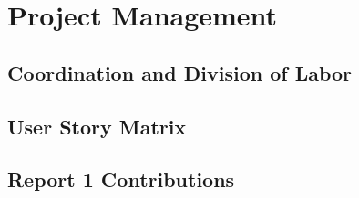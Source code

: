\chapter{Project Management}
\section{Coordination and Division of Labor}
\section{User Story Matrix}
\section{Report 1 Contributions}
